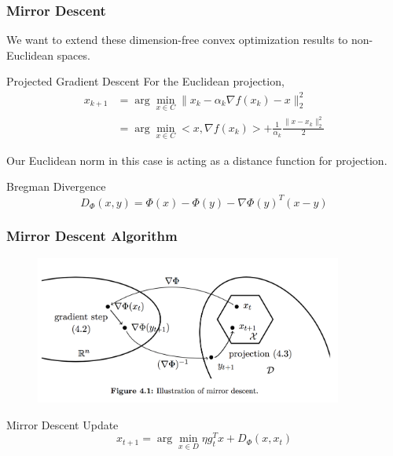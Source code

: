 \documentclass{beamer}
\begin{document}
\begin{frame}
\frametitle{Mirror Descent}
We want to extend these dimension-free convex optimization results to non-Euclidean spaces.
\begin{block}{Projected Gradient Descent}
For the Euclidean projection,
\begin{align*}
x_{k+1} &= \arg\min_{x \in C}\|x_k -\alpha_k \nabla f(x_k) - x\|_2^2 \\
&= \arg\min_{x \in C} <x, \nabla f(x_k)> + \frac{1}{\alpha_k}\frac{\|x - x_k\|_2^2}{2}
\end{align*}
\end{block}
Our Euclidean norm in this case is acting as a distance function for projection.
\begin{block}{Bregman Divergence}
$$D_\Phi(x,y) = \Phi(x) - \Phi(y) - \nabla \Phi(y)^T(x-y)$$
\end{block}
\end{frame}

\begin{frame}
\frametitle{Mirror Descent Algorithm}
\begin{figure}
    \centering
    \includegraphics[width=0.9\textwidth]{Images/mda.png}
\end{figure}
\begin{block}{Mirror Descent Update}
$$x_{t+1} = \arg\min_{x \in D} \eta g_t^Tx + D_{\Phi}(x,x_t)$$
\end{block}
\end{frame}


\end{document}
